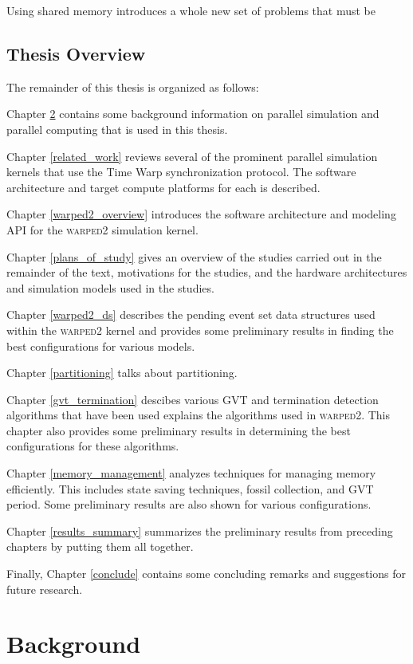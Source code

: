 \documentclass[11pt]{book}
\begin{document}
Using shared memory introduces a whole new set of problems that must be 

\section{Thesis Overview}

The remainder of this thesis is organized as follows:

Chapter \ref{background} contains some background information on parallel simulation and
parallel computing that is used in this thesis.

Chapter \ref{related_work} reviews several of the prominent parallel simulation kernels
that use the Time Warp synchronization protocol.  The software architecture and target
compute platforms for each is described.

Chapter \ref{warped2_overview} introduces the software architecture and modeling API for
the \textsc{warped2} simulation kernel.

Chapter \ref{plans_of_study} gives an overview of the studies carried out in the remainder
of the text, motivations for the studies, and the hardware architectures and simulation
models used in the studies.

Chapter \ref{warped2_ds} describes the pending event set data structures used within
the \textsc{warped2} kernel and provides some preliminary results in finding the best
configurations for various models.

Chapter \ref{partitioning} talks about partitioning.

Chapter \ref{gvt_termination} descibes various GVT and termination detection algorithms that
have been used explains the algorithms used in \textsc{warped2}. This chapter also provides
some preliminary results in determining the best configurations for these algorithms.

Chapter \ref{memory_management} analyzes techniques for managing memory efficiently. This
includes state saving techniques, fossil collection, and GVT period. Some preliminary results
are also shown for various configurations.

Chapter \ref{results_summary} summarizes the preliminary results from preceding chapters by
putting them all together.

Finally, Chapter \ref{conclude} contains some concluding remarks and suggestions for future
research.



\chapter{Background}\label{background}
\end{document}

